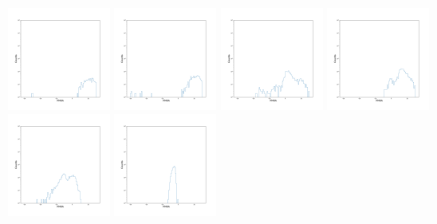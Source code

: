 \documentclass[12pt,prd]{article}
\begin{document}
\begin{figure}[h!]
\includegraphics[width=0.24\textwidth]{../figures/stars_passing_cut_rahistgaiascan_l101_2_b58_4_ra212_7_dec55_2_npy_5.pdf}
\includegraphics[width=0.24\textwidth]{../figures/stars_passing_cut_rahistgaiascan_l101_2_b58_4_ra212_7_dec55_2_npy_6.pdf}
\includegraphics[width=0.24\textwidth]{../figures/stars_passing_cut_rahistgaiascan_l101_2_b58_4_ra212_7_dec55_2_npy_7.pdf}
\includegraphics[width=0.24\textwidth]{../figures/stars_passing_cut_rahistgaiascan_l101_2_b58_4_ra212_7_dec55_2_npy_8.pdf}
\includegraphics[width=0.24\textwidth]{../figures/stars_passing_cut_rahistgaiascan_l101_2_b58_4_ra212_7_dec55_2_npy_9.pdf}
\includegraphics[width=0.24\textwidth]{../figures/stars_passing_cut_rahistgaiascan_l101_2_b58_4_ra212_7_dec55_2_npy_10.pdf}

\end{figure}
\end{document}
